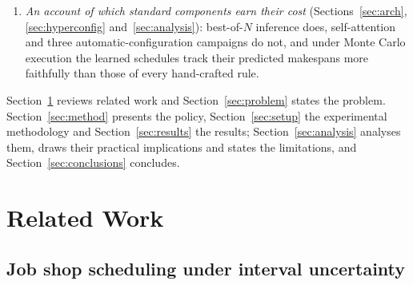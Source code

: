 \documentclass[preprint,authoryear,12pt]{elsarticle}
\theoremstyle{definition}
\theoremstyle{remark}
\begin{document}
\begin{enumerate}
  contribute is settled empirically rather than assumed. Its
  examination on the trained policy: a permutation
  audit and two retraining ablations that probe the widths as inputs,
  whose effect on unseen instances is bounded within a third of a
  point either way, and the intervals as training data. And the contrast between the paradigms: a width-penalizing
  objective narrows the policy's schedules mainly through sample
  selection, no systematic narrowing surviving a common selection
  criterion, and acts through the evolved representation in the GP
  study~\citep{DiazGP2026}.
\item \emph{An account of which standard components earn their cost}
  (Sections~\ref{sec:arch}, \ref{sec:hyperconfig}
  and~\ref{sec:analysis}): best-of-$N$ inference does,
  self-attention and three automatic-configuration campaigns do not,
  and under Monte Carlo execution the learned schedules track their
  predicted makespans more faithfully than those of every
  hand-crafted rule.
\end{enumerate}

Section~\ref{sec:related} reviews related work and
Section~\ref{sec:problem} states the problem.
Section~\ref{sec:method} presents the policy,
Section~\ref{sec:setup} the experimental methodology and
Section~\ref{sec:results} the results;
Section~\ref{sec:analysis} analyses them, draws their practical
implications and states the limitations, and
Section~\ref{sec:conclusions} concludes.

\section{Related Work}
\label{sec:related}

\subsection{Job shop scheduling under interval uncertainty}
\end{document}
